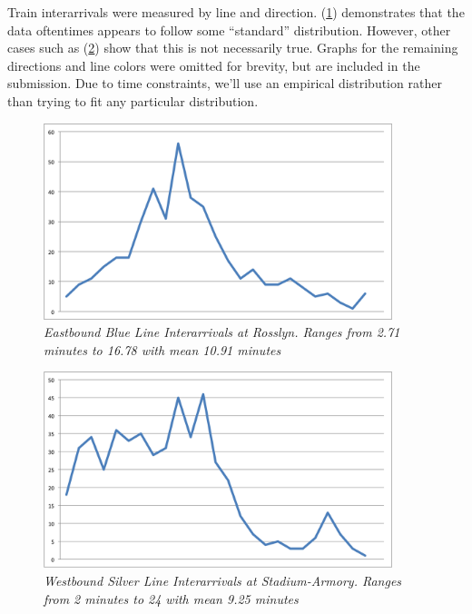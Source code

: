 \documentclass[a4paper,12pt]{article}
\begin{document}
Train interarrivals were measured by line and direction. (\ref{fig:eastboundblueinterarrivals}) demonstrates that the
data oftentimes appears to follow some ``standard'' distribution. However, other cases such as
(\ref{fig:westboundsilverinterarrivals}) show that this is not necessarily true. Graphs for the remaining directions
and line colors were omitted for brevity, but are included in
the submission. Due to time constraints, we'll use an empirical distribution rather than trying to fit any particular
distribution.

\begin{figure}
\begin{center}
\includegraphics[width=4in]{../images/train_interarrivals/eastbound_blue_interarrivals.png}
\caption{\small \sl Eastbound Blue Line Interarrivals at Rosslyn. Ranges from 2.71 minutes to 16.78 with mean 10.91 minutes \label{fig:eastboundblueinterarrivals}}
\end{center}
\end{figure}

\begin{figure}
\begin{center}
\includegraphics[width=4in]{../images/train_interarrivals/westbound_silver_interarrivals.png}
\caption{\small \sl Westbound Silver Line Interarrivals at Stadium-Armory. Ranges from 2 minutes to 24 with mean 9.25 minutes \label{fig:westboundsilverinterarrivals}}
\end{center}
\end{figure}
\end{document}
